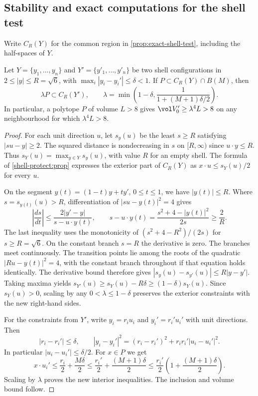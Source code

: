 \subsection{Stability and exact computations for the shell test}
\label{sec:shell-computation}

Write \(C_R(Y)\) for the common region in \cref{prop:exact-shell-test},
including the half-spaces of \(Y\).

\begin{lem}
\label{lem:shell-certificate-stability}
Let \(Y=\{y_1,\ldots,y_n\}\) and \(Y'=\{y'_1,\ldots,y'_n\}\)
be two shell configurations in \(2\le |y|\le R=\sqrt6\), with
\(\max_i|y_i-y_i'|\le\delta<1\). If \(P\subset C_R(Y)\cap B(M)\), then
\[
 \lambda P\subset C_R(Y'),\qquad
 \lambda=\min\left(1-\delta,\frac{1}{1+(M+1)\delta/2}\right).
\]
In particular, a polytope \(P\) of volume \(L>8\) gives
\(\vol V_0'\ge\lambda^4 L>8\) on any neighbourhood for which
\(\lambda^4 L>8\).
\end{lem}

\begin{proof}
For each unit direction \(u\), let \(s_y(u)\) be the least \(s\ge R\)
satisfying \(|su-y|\ge2\). The squared distance is nondecreasing in \(s\)
on \([R,\infty)\) since \(u\cdot y\le R\). Thus
\(s_Y(u)=\max_{y\in Y}s_y(u)\), with value \(R\) for an empty shell.
The formula of \cref{shell-protect:prop} expresses the exterior part of
\(C_R(Y)\) as \(x\cdot u\le s_Y(u)/2\) for every \(u\).

On the segment \(y(t)=(1-t)y+ty'\), \(0\le t\le1\), we have \(|y(t)|\le R\).
Where \(s=s_{y(t)}(u)>R\), differentiation of \(|su-y(t)|^2=4\) gives
\[
 \left|\frac{ds}{dt}\right|
 \le \frac{2|y'-y|}{s-u\cdot y(t)},\qquad
 s-u\cdot y(t)=\frac{s^2+4-|y(t)|^2}{2s}\ge\frac{2}{R}.
\]
The last inequality uses the monotonicity of \((s^2+4-R^2)/(2s)\) for
\(s\ge R=\sqrt6\). On the constant branch \(s=R\) the derivative is zero.
The branches meet continuously. The transition points lie among the
roots of the quadratic \(|Ru-y(t)|^2=4\), with the constant branch
throughout if that equation holds identically. The derivative bound
therefore gives \(|s_y(u)-s_{y'}(u)|\le R|y-y'|\). Taking maxima yields
\(s_{Y'}(u)\ge s_Y(u)-R\delta\ge(1-\delta)s_Y(u)\).
Since \(s_Y(u)>0\), scaling by any \(0<\lambda\le1-\delta\) preserves
the exterior constraints with the new right-hand sides.

For the constraints from \(Y'\), write \(y_i=r_i u_i\) and
\(y_i'=r_i' u_i'\) with unit directions. Then
\[
 |r_i-r_i'|\le\delta,\qquad
 |y_i-y_i'|^2=(r_i-r_i')^2+r_i r_i'|u_i-u_i'|^2.
\]
In particular \(|u_i-u_i'|\le\delta/2\).
For \(x\in P\) we get
\[
 x\cdot u_i'\le\frac{r_i}{2}+\frac{M\delta}{2}
 \le\frac{r_i'}2+\frac{(M+1)\delta}2
 \le\frac{r_i'}2\left(1+\frac{(M+1)\delta}{2}\right).
\]
Scaling by \(\lambda\) proves the new interior inequalities. The
inclusion and volume bound follow.
\end{proof}

